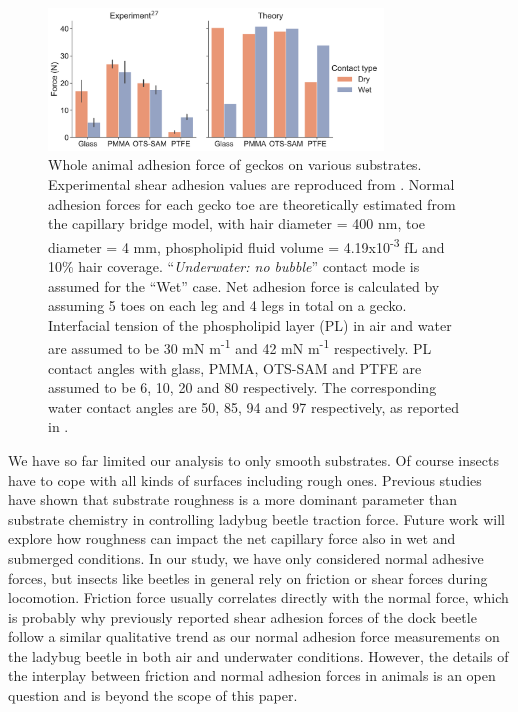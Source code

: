 \documentclass[vruler,JEB]{COB}%
\begin{document}
\begin{figure}
\centering
\includegraphics[width=3.5in]{Figure-9-Gecko_comparison}\caption{\label{fig:Comparison-with-model}Whole animal adhesion force of geckos
on various substrates. Experimental shear adhesion values are reproduced
from \citet{RN15}. Normal adhesion forces for each gecko
toe are theoretically estimated from the capillary bridge model, with
hair diameter = 400 nm, toe diameter = 4 mm, phospholipid fluid volume
= 4.19x10\protect\textsuperscript{-3} fL and 10\% hair coverage.
\textquotedblleft\emph{Underwater: no bubble}\textquotedblright{}
contact mode is assumed for the \textquotedblleft Wet\textquotedblright{}
case. Net adhesion force is calculated by assuming 5 toes on each
leg and 4 legs in total on a gecko. Interfacial tension of the phospholipid
layer (PL) in air and water are assumed to be 30 mN m\protect\textsuperscript{-1} and 42 mN m\protect\textsuperscript{-1}
respectively. PL contact angles with glass, PMMA, OTS-SAM and PTFE
are assumed to be 6\textdegree , 10\textdegree , 20\textdegree{} and
80\textdegree{} respectively. The corresponding water contact angles
are 50\textdegree , 85\textdegree , 94\textdegree{} and 97\textdegree{}
respectively, as reported in \citet{RN15}.}
\end{figure}
We have so far limited our analysis to only smooth substrates. Of course insects
have to cope with all kinds of surfaces including rough ones.
Previous studies \citep{RN136} have shown that substrate roughness
is a more dominant parameter than substrate chemistry in controlling
ladybug beetle traction force. Future work will explore how roughness can impact
the net capillary force also in wet and submerged conditions. In our study, we have only considered normal adhesive forces, but insects like beetles in general rely on friction or shear forces during locomotion. Friction force usually correlates directly with the normal force, which is probably why previously reported shear adhesion forces of the dock beetle \citep{RN87} follow a similar qualitative trend as our normal adhesion force measurements on the ladybug beetle in both air and underwater conditions. However, the details of the interplay between friction and normal adhesion forces in animals is an open question and is beyond the scope of this paper. 
\end{document}
